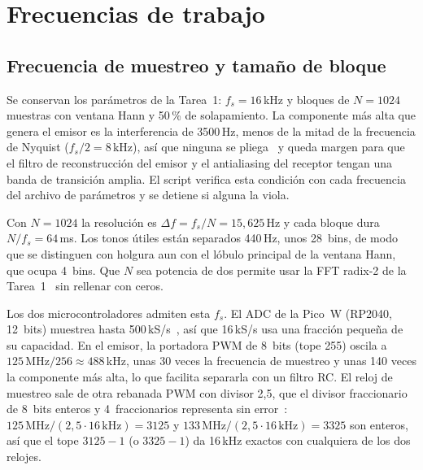 


\section{Frecuencias de trabajo}
\label{sec:senales}

\subsection{Frecuencia de muestreo y tamaño de bloque}

Se conservan los parámetros de la Tarea~1: $f_s = 16$\,kHz y bloques de
$N = 1024$ muestras con ventana Hann y 50\,\% de solapamiento. La componente
más alta que genera el emisor es la interferencia de 3500\,Hz, menos de la
mitad de la frecuencia de Nyquist ($f_s/2 = 8$\,kHz), así que ninguna se pliega~\cite{oppenheim2010}
y queda margen para que el filtro de reconstrucción del emisor y el
antialiasing del receptor tengan una banda de transición amplia. El script
verifica esta condición con cada frecuencia del archivo de parámetros y se
detiene si alguna la viola.

Con $N = 1024$ la resolución es $\Delta f = f_s/N = 15{,}625$\,Hz y cada bloque
dura $N/f_s = 64$\,ms. Los tonos útiles están separados 440\,Hz, unos
28~bins, de modo que se distinguen con holgura aun con el lóbulo principal de
la ventana Hann, que ocupa 4~bins. Que $N$ sea potencia de dos permite usar la
FFT radix-2 de la Tarea~1~\cite{cooley1965} sin rellenar con ceros.

Los dos microcontroladores admiten esta $f_s$. El ADC de la Pico~W (RP2040,
12~bits) muestrea hasta 500\,kS/s~\cite{rp2040}, así que 16\,kS/s usa una fracción pequeña de
su capacidad. En el emisor, la portadora PWM de 8~bits (tope 255) oscila a
$125\,\text{MHz}/256 \approx 488$\,kHz, unas 30 veces la frecuencia de muestreo
y unas 140 veces la componente más alta, lo que facilita separarla con un
filtro RC. El reloj de muestreo sale de otra rebanada PWM con divisor 2,5, que el divisor
fraccionario de 8~bits enteros y 4~fraccionarios representa sin error~\cite{rp2040}:
$125\,\text{MHz}/(2{,}5 \cdot 16\,\text{kHz}) = 3125$ y
$133\,\text{MHz}/(2{,}5 \cdot 16\,\text{kHz}) = 3325$ son enteros, así que el
tope $3125-1$ (o $3325-1$) da 16\,kHz exactos con cualquiera de los dos relojes.

